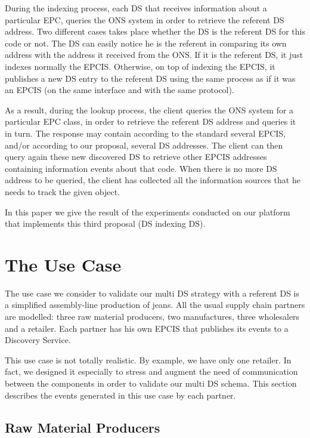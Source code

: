 \documentclass[a4paper]{llncs}
\begin{document}
During the indexing process, each DS that receives information about a
particular EPC, queries the ONS system in order to retrieve the referent DS
address.  Two different cases takes place whether the DS is the referent DS for
this code or not. The DS can easily notice he is the referent in comparing its
own address with the address it received from the ONS. If it is the referent
DS, it just indexes normally the EPCIS.  Otherwise, on top of indexing the
EPCIS, it publishes a new DS entry to the referent DS using the same process as
if it was an EPCIS (on the same interface and with the same protocol).

As a result, during the lookup process, the client queries the ONS system for a
particular EPC class, in order to
retrieve the referent DS address  and queries it in turn.
The response may contain according to the standard several EPCIS, and/or
according to our proposal, several DS addresses. The client can then
query again these new discovered DS to retrieve other EPCIS addresses
containing information events about that code. When
there is no more DS address to be queried, the client has collected all the
information sources that he needs to track the given object.

In this paper we give the result of the experiments conducted on our platform
that implements this third proposal (DS indexing DS).  

\section{The Use Case}

The use case we consider to validate our multi DS strategy with a referent DS
is a simplified assembly-line production of jeans. All the usual supply chain
partners are modelled: three raw material producers, two manufactures, three
wholesalers and a retailer. Each partner has his own EPCIS that publishes its
events to a Discovery Service. 

This use case is not totally realistic. By example, we have only one retailer. In fact, we
designed it especially to stress and augment the need of communication between
the components  in order to validate our multi DS schema. This section describes the
events generated in this use case by each partner.

\subsection{Raw Material Producers}
\end{document}
